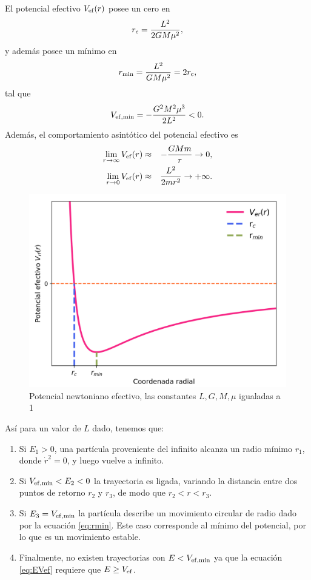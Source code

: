     El potencial efectivo $V_{\rm ef}(r)$ posee un cero en
\begin{eqnarray}
    r_{\rm c}=\frac{L^2}{2GM\mu^2} ,\label{eq:cero1}
\end{eqnarray}
y además posee un mínimo en
\begin{eqnarray}
r_{\rm min}=\frac{L^2}{GM\mu^2}=2r_{\rm c},\label{eq:rmin}
\end{eqnarray}
tal que
\begin{eqnarray*}
V_{\rm ef, min}=-\frac{G^2M^2\mu^3}{2L^2}<0.
\end{eqnarray*}
Además, el comportamiento asintótico del potencial efectivo es
\begin{eqnarray*}
\lim_{r\to\infty}V_{\rm ef}(r)&\approx&-\frac{GMm}{r}\rightarrow 0,\\
\lim_{r\to 0}V_{\rm ef}(r)&\approx&\frac{L^2}{2mr^2}\rightarrow +\infty .
\end{eqnarray*}
\begin{figure}[H]
    \centering
    \includegraphics[scale=0.6]{images/Pot_efe.png}
    \caption{Potencial newtoniano efectivo, las constantes $L,G,M,\mu$ igualadas a 1}
    \label{fig:pot}
\end{figure}
Así para un valor de $L$ dado, tenemos que:
\begin{enumerate}
    \item Si $E_1>0$, una partícula proveniente del infinito alcanza un radio
    mínimo $r_1$, donde $\dot{r}^2=0$, y luego vuelve a infinito.
    \item Si $V_{\rm ef, min}<E_2<0$ la trayectoria es ligada, variando la distancia entre dos puntos de retorno $r_2$ y $r_3$, de modo que $r_2<r<r_{3}$.
    \item Si $E_{3}=V_{\rm ef, min}$ la partícula
    describe un movimiento circular de radio dado por la ecuación \ref{eq:rmin}. Este caso
    corresponde al mínimo del potencial, por lo que es un
    movimiento estable.
    \item Finalmente, no existen trayectorias con $E<V_{\rm ef, min}$ ya que la ecuación \ref{eq:EVef} requiere que $E\ge V_{\rm ef}$.
\end{enumerate}

